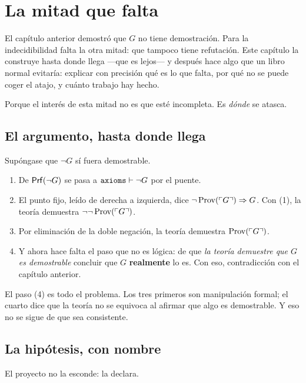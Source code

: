 \chapter{La mitad que falta}
\label{cap:mitad-que-falta}

El capítulo anterior demostró que $G$ no tiene demostración. Para la indecidibilidad falta la otra
mitad: que tampoco tiene refutación. Este capítulo la construye hasta donde llega —que es lejos— y
después hace algo que un libro normal evitaría: explicar con precisión qué es lo que falta, por qué
no se puede coger el atajo, y cuánto trabajo hay hecho.

Porque el interés de esta mitad no es que esté incompleta. Es \emph{dónde} se atasca.

\section{El argumento, hasta donde llega}

Supóngase que $\lnot G$ sí fuera demostrable.

\begin{matematica}
\begin{enumerate}
\item De $\mathsf{Prf}(\lnot G)$ se pasa a $\text{\ident{axioms}} \derives \lnot G$ por el puente.
\item El punto fijo, leído de derecha a izquierda, dice
  $\lnot\operatorname{Prov}(\ulcorner G \urcorner) \Rightarrow G$. Con (1), la teoría demuestra
  $\lnot\lnot\operatorname{Prov}(\ulcorner G \urcorner)$.
\item Por eliminación de la doble negación, la teoría demuestra $\operatorname{Prov}(\ulcorner G \urcorner)$.
\item Y ahora hace falta el paso que no es lógica: de que \emph{la teoría demuestre que $G$ es
  demostrable} concluir que $G$ \textbf{realmente} lo es. Con eso, contradicción con el capítulo
  anterior.
\end{enumerate}
\end{matematica}

El paso (4) es todo el problema. Los tres primeros son manipulación formal; el cuarto dice que la
teoría no se equivoca al afirmar que algo es demostrable. Y eso no se sigue de que sea consistente.

\section{La hipótesis, con nombre}

El proyecto no la esconde: la declara.

